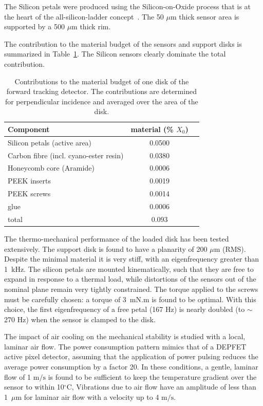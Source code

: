 The Silicon petals were produced using the Silicon-on-Oxide process that is at the heart of the
all-silicon-ladder concept~\cite{Andricek:2004cj}. The 50 $\mu \mathrm{m}$ thick sensor area is supported by a 500 $\mu \mathrm{m}$ thick rim.

The contribution to the material budget of the sensors and support disks is 
summarized in Table~\ref{tab:ftd_disk_material_budget}. The Silicon sensors clearly
dominate the total contribution.

\begin{table}[]
    \centering
    \begin{tabular}{lcc}
    \toprule
    Component                      & material (\% $X_0$) \\ \midrule
    Silicon petals (active area)  &         0.0500 \\
    Carbon fibre (incl. cyano-ester resin)     &   0.0380 \\
    Honeycomb core (Aramide)      &   0.0006 \\
    PEEK inserts                  &   0.0019 \\
    PEEK screws                   &   0.0014 \\
    glue                          &   0.0006  \\ \midrule
    total                         &     0.093      \\ \bottomrule
    \end{tabular}
    \caption{Contributions to the material budget of one disk of the forward tracking detector. The contributions are determined for perpendicular incidence and averaged over the area
    of the disk.}
    \label{tab:ftd_disk_material_budget}
\end{table}

The thermo-mechanical performance of the loaded disk has been tested extensively. The 
support disk is found to have a planarity of 200 $\mu \mathrm{m}$ (RMS). Despite the 
minimal material it is very stiff, with an eigenfrequency greater than 1~kHz. The
silicon petals are mounted kinematically, such that they are free to expand in response
to a thermal load, while distortions of the sensors out of the nominal plane remain
very tightly constrained. The torque applied to the screws must be carefully
chosen: a torque of 3~mN.m is found to be optimal. 
With this choice, the first eigenfrequency of a free petal (167 Hz) is nearly
doubled (to $\sim$ 270 Hz) when the sensor is clamped to the disk. 

The impact of air cooling on the mechanical stability is studied with a local, 
laminar air flow. The power consumption pattern mimics that of a DEPFET
active pixel detector, assuming that the application of power pulsing reduces
the average power consumption by a factor 20.
In these conditions, a gentle, laminar flow of 1 $\mathrm{m/s}$ is found to be sufficient
to keep the temperature gradient over the sensor to within 10$^{\circ}$C, 
Vibrations due to air flow have an  amplitude of less than 1~$\mu \mathrm{m}$ 
for laminar air flow with a velocity up to 4 $\mathrm{m/s}$. 

